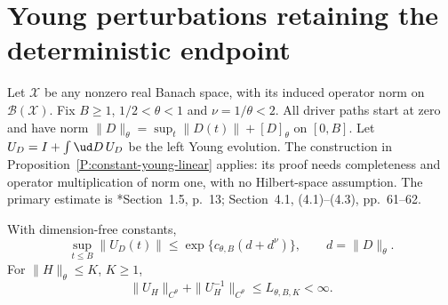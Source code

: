 \section{Young perturbations retaining the deterministic endpoint}
\label{S:young-upper-foundation}

Let $\mathcal X$ be any nonzero real Banach space, with its induced
operator norm on $\mathcal B(\mathcal X)$.
Fix $B\ge1$, $1/2<\theta<1$ and $\nu=1/\theta<2$.
All driver paths start at zero and have norm
$\|D\|_\theta=\sup_t\|D(t)\|+[D]_\theta$ on $[0,B]$.
Let $U_D=I+\int\ud D\,U_D$ be the left Young evolution.
The construction in Proposition~\ref{P:constant-young-linear} applies:
its proof needs completeness and operator multiplication of norm one,
with no Hilbert-space assumption.
The primary estimate is
\cite{friz.hairer:20:course}*{Section~1.5, p.~13;
Section~4.1, (4.1)--(4.3), pp.~61--62}.

\begin{lemma}
  \label{L:young-upper-growth}
  With dimension-free constants,
  \begin{equation}\label{E:young-upper-refined-growth}
    \sup_{t\le B}\|U_D(t)\|
    \le\exp\{c_{\theta,B}(d+d^\nu)\},\qquad d=\|D\|_\theta .
  \end{equation}
  For $\|H\|_\theta\le K$, $K\ge1$,
  \begin{equation}\label{E:young-upper-inverse-control}
    \|U_H\|_{C^\theta}+\|U_H^{-1}\|_{C^\theta}
    \le L_{\theta,B,K}<\infty .
  \end{equation}
\end{lemma}

